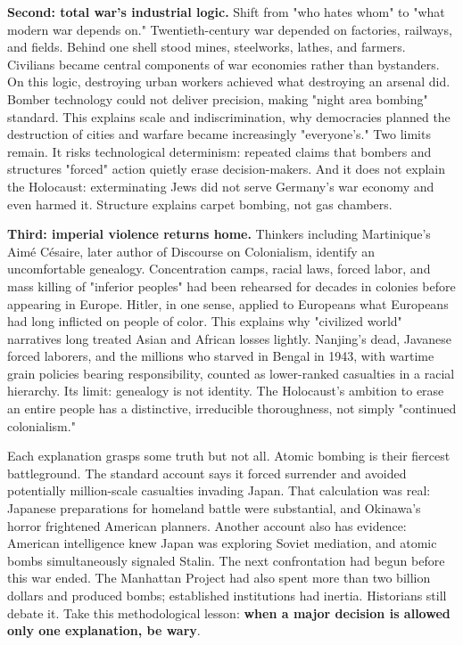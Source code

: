 \textbf{Second: total war's industrial logic.} Shift from "who hates whom" to "what modern war depends on." Twentieth-century war depended on factories, railways, and fields. Behind one shell stood mines, steelworks, lathes, and farmers. Civilians became central components of war economies rather than bystanders. On this logic, destroying urban workers achieved what destroying an arsenal did. Bomber technology could not deliver precision, making "night area bombing" standard. This explains scale and indiscrimination, why democracies planned the destruction of cities and warfare became increasingly "everyone's." Two limits remain. It risks technological determinism: repeated claims that bombers and structures "forced" action quietly erase decision-makers. And it does not explain the Holocaust: exterminating Jews did not serve Germany's war economy and even harmed it. Structure explains carpet bombing, not gas chambers.

\textbf{Third: imperial violence returns home.} Thinkers including Martinique's Aimé Césaire, later author of Discourse on Colonialism, identify an uncomfortable genealogy. Concentration camps, racial laws, forced labor, and mass killing of "inferior peoples" had been rehearsed for decades in colonies before appearing in Europe. Hitler, in one sense, applied to Europeans what Europeans had long inflicted on people of color. This explains why "civilized world" narratives long treated Asian and African losses lightly. Nanjing's dead, Javanese forced laborers, and the millions who starved in Bengal in 1943, with wartime grain policies bearing responsibility, counted as lower-ranked casualties in a racial hierarchy. Its limit: genealogy is not identity. The Holocaust's ambition to erase an entire people has a distinctive, irreducible thoroughness, not simply "continued colonialism."

Each explanation grasps some truth but not all. Atomic bombing is their fiercest battleground. The standard account says it forced surrender and avoided potentially million-scale casualties invading Japan. That calculation was real: Japanese preparations for homeland battle were substantial, and Okinawa's horror frightened American planners. Another account also has evidence: American intelligence knew Japan was exploring Soviet mediation, and atomic bombs simultaneously signaled Stalin. The next confrontation had begun before this war ended. The Manhattan Project had also spent more than two billion dollars and produced bombs; established institutions had inertia. Historians still debate it. Take this methodological lesson: \textbf{when a major decision is allowed only one explanation, be wary}.

